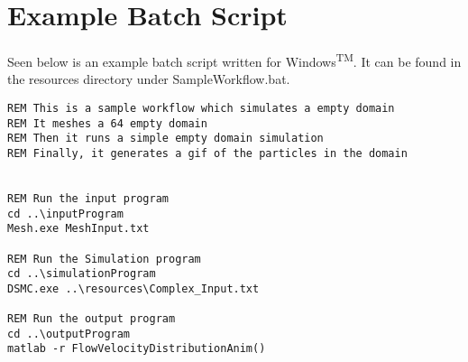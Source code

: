 \chapter{Example Batch Script}
\label{app:examplescript}
Seen below is an example batch script written for Windows\textsuperscript{TM}. It can be found in the resources directory under SampleWorkflow.bat. 

\begin{verbatim}
REM This is a sample workflow which simulates a empty domain
REM It meshes a 64 empty domain
REM Then it runs a simple empty domain simulation
REM Finally, it generates a gif of the particles in the domain


REM Run the input program
cd ..\inputProgram
Mesh.exe MeshInput.txt

REM Run the Simulation program
cd ..\simulationProgram
DSMC.exe ..\resources\Complex_Input.txt

REM Run the output program
cd ..\outputProgram
matlab -r FlowVelocityDistributionAnim()
\end{verbatim}

